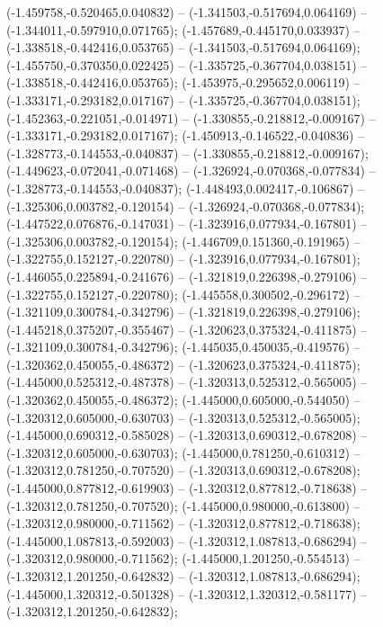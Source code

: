  (-1.459758,-0.520465,0.040832) -- (-1.341503,-0.517694,0.064169) -- (-1.344011,-0.597910,0.071765);
 (-1.457689,-0.445170,0.033937) -- (-1.338518,-0.442416,0.053765) -- (-1.341503,-0.517694,0.064169);
 (-1.455750,-0.370350,0.022425) -- (-1.335725,-0.367704,0.038151) -- (-1.338518,-0.442416,0.053765);
 (-1.453975,-0.295652,0.006119) -- (-1.333171,-0.293182,0.017167) -- (-1.335725,-0.367704,0.038151);
 (-1.452363,-0.221051,-0.014971) -- (-1.330855,-0.218812,-0.009167) -- (-1.333171,-0.293182,0.017167);
 (-1.450913,-0.146522,-0.040836) -- (-1.328773,-0.144553,-0.040837) -- (-1.330855,-0.218812,-0.009167);
 (-1.449623,-0.072041,-0.071468) -- (-1.326924,-0.070368,-0.077834) -- (-1.328773,-0.144553,-0.040837);
 (-1.448493,0.002417,-0.106867) -- (-1.325306,0.003782,-0.120154) -- (-1.326924,-0.070368,-0.077834);
 (-1.447522,0.076876,-0.147031) -- (-1.323916,0.077934,-0.167801) -- (-1.325306,0.003782,-0.120154);
 (-1.446709,0.151360,-0.191965) -- (-1.322755,0.152127,-0.220780) -- (-1.323916,0.077934,-0.167801);
 (-1.446055,0.225894,-0.241676) -- (-1.321819,0.226398,-0.279106) -- (-1.322755,0.152127,-0.220780);
 (-1.445558,0.300502,-0.296172) -- (-1.321109,0.300784,-0.342796) -- (-1.321819,0.226398,-0.279106);
 (-1.445218,0.375207,-0.355467) -- (-1.320623,0.375324,-0.411875) -- (-1.321109,0.300784,-0.342796);
 (-1.445035,0.450035,-0.419576) -- (-1.320362,0.450055,-0.486372) -- (-1.320623,0.375324,-0.411875);
 (-1.445000,0.525312,-0.487378) -- (-1.320313,0.525312,-0.565005) -- (-1.320362,0.450055,-0.486372);
 (-1.445000,0.605000,-0.544050) -- (-1.320312,0.605000,-0.630703) -- (-1.320313,0.525312,-0.565005);
 (-1.445000,0.690312,-0.585028) -- (-1.320313,0.690312,-0.678208) -- (-1.320312,0.605000,-0.630703);
 (-1.445000,0.781250,-0.610312) -- (-1.320312,0.781250,-0.707520) -- (-1.320313,0.690312,-0.678208);
 (-1.445000,0.877812,-0.619903) -- (-1.320312,0.877812,-0.718638) -- (-1.320312,0.781250,-0.707520);
 (-1.445000,0.980000,-0.613800) -- (-1.320312,0.980000,-0.711562) -- (-1.320312,0.877812,-0.718638);
 (-1.445000,1.087813,-0.592003) -- (-1.320312,1.087813,-0.686294) -- (-1.320312,0.980000,-0.711562);
 (-1.445000,1.201250,-0.554513) -- (-1.320312,1.201250,-0.642832) -- (-1.320312,1.087813,-0.686294);
 (-1.445000,1.320312,-0.501328) -- (-1.320312,1.320312,-0.581177) -- (-1.320312,1.201250,-0.642832);
